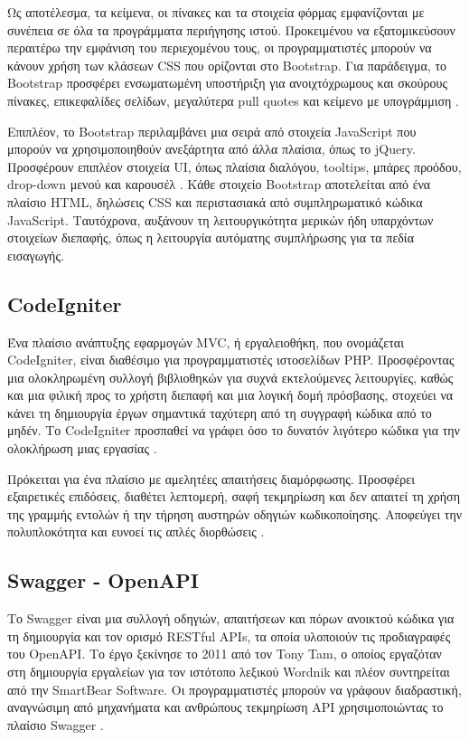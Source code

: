 Ως αποτέλεσμα, τα κείμενα, οι πίνακες και τα στοιχεία φόρμας εμφανίζονται με συνέπεια σε όλα τα προγράμματα περιήγησης ιστού. Προκειμένου να εξατομικεύσουν περαιτέρω την εμφάνιση του περιεχομένου τους, οι προγραμματιστές μπορούν να κάνουν χρήση των κλάσεων CSS που ορίζονται στο Bootstrap. Για παράδειγμα, το Bootstrap προσφέρει ενσωματωμένη υποστήριξη για ανοιχτόχρωμους και σκούρους πίνακες, επικεφαλίδες σελίδων, μεγαλύτερα pull quotes και κείμενο με υπογράμμιση \cite{bootstrap_2}.

Επιπλέον, το Bootstrap περιλαμβάνει μια σειρά από στοιχεία JavaScript που μπορούν να χρησιμοποιηθούν ανεξάρτητα από άλλα πλαίσια, όπως το jQuery. Προσφέρουν επιπλέον στοιχεία UI, όπως πλαίσια διαλόγου, tooltips, μπάρες προόδου, drop-down μενού και καρουσέλ \cite{gaikwad2019review}. Κάθε στοιχείο Bootstrap αποτελείται από ένα πλαίσιο HTML, δηλώσεις CSS και περιστασιακά από συμπληρωματικό κώδικα JavaScript. Ταυτόχρονα, αυξάνουν τη λειτουργικότητα μερικών ήδη υπαρχόντων στοιχείων διεπαφής, όπως η λειτουργία αυτόματης συμπλήρωσης για τα πεδία εισαγωγής.

\subsection{CodeIgniter}
Ένα πλαίσιο ανάπτυξης εφαρμογών MVC, ή εργαλειοθήκη, που ονομάζεται CodeIgniter, είναι διαθέσιμο για προγραμματιστές ιστοσελίδων PHP. Προσφέροντας μια ολοκληρωμένη συλλογή βιβλιοθηκών για συχνά εκτελούμενες λειτουργίες, καθώς και μια φιλική προς το χρήστη διεπαφή και μια λογική δομή πρόσβασης, στοχεύει να κάνει τη δημιουργία έργων σημαντικά ταχύτερη από τη συγγραφή κώδικα από το μηδέν. Το CodeIgniter προσπαθεί να γράφει όσο το δυνατόν λιγότερο κώδικα για την ολοκλήρωση μιας εργασίας \cite{Jackson_2020}.

Πρόκειται για ένα πλαίσιο με αμελητέες απαιτήσεις διαμόρφωσης. Προσφέρει εξαιρετικές επιδόσεις, διαθέτει λεπτομερή, σαφή τεκμηρίωση και δεν απαιτεί τη χρήση της γραμμής εντολών ή την τήρηση αυστηρών οδηγιών κωδικοποίησης. Αποφεύγει την πολυπλοκότητα και ευνοεί τις απλές διορθώσεις \cite{CodeIgniter_intro}.

\subsection{Swagger - OpenAPI}
Το Swagger είναι μια συλλογή οδηγιών, απαιτήσεων και πόρων ανοικτού κώδικα για τη δημιουργία και τον ορισμό RESTful APIs, τα οποία υλοποιούν τις προδιαγραφές του OpenAPI. Το έργο ξεκίνησε το 2011 από τον Tony Tam, ο οποίος εργαζόταν στη δημιουργία εργαλείων για τον ιστότοπο λεξικού Wordnik και πλέον συντηρείται από την SmartBear Software. Οι προγραμματιστές μπορούν να γράφουν διαδραστική, αναγνώσιμη από μηχανήματα και ανθρώπους τεκμηρίωση API χρησιμοποιώντας το πλαίσιο Swagger \cite{Swagger_2022}.

